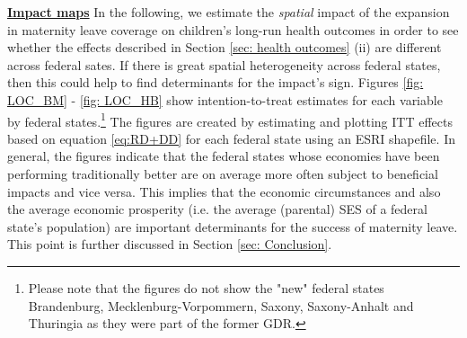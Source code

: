\documentclass[a4paper ]{article}
\begin{document}
\newpage
\underline{\textbf{Impact maps}}\newline
In the following, we estimate the \emph{spatial} impact of the expansion in maternity leave coverage on children's long-run health outcomes in order to see whether the effects described in Section \ref{sec: health outcomes} (ii) are different across federal sates. If there is great spatial heterogeneity across federal states, then this could help to find determinants for the impact's sign. Figures \ref{fig: LOC_BM} - \ref{fig: LOC_HB} show intention-to-treat estimates for each variable by federal states.\footnote{Please note that the figures do not show the "new" federal states Brandenburg, Mecklenburg-Vorpommern, Saxony, Saxony-Anhalt and Thuringia as they were part of the former GDR.} The figures are created by estimating and plotting ITT effects based on equation \ref{eq:RD+DD} for each federal state using an ESRI shapefile. \newline
In general, the figures indicate that the federal states whose economies have been performing traditionally better are on average more often subject to beneficial impacts and vice versa. This implies that the economic circumstances and also the average economic prosperity (i.e. the average (parental) SES of a federal state's population) are important determinants for the success of maternity leave. This point is further discussed in Section \ref{sec: Conclusion}.\newline \bigskip
\end{document}
